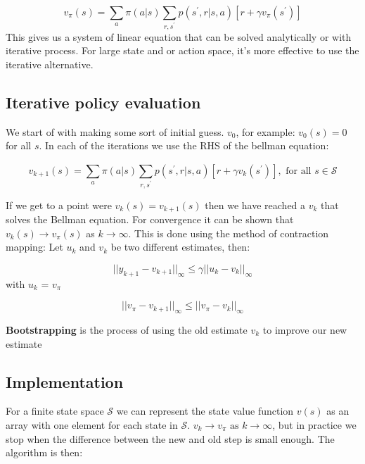 	\begin{equation}
		v_\pi(s) = \sum_{a}^{} \pi (a|s) \sum_{r,s^{\prime}}^{} p(s^{\prime},r|s,a)[r + \gamma v_\pi(s^{\prime})] 
	\end{equation}
This gives us a system of linear equation that can be solved analytically or with iterative process. For large state and or action space, it's more effective to use the iterative alternative. 

\subsection*{Iterative policy evaluation}
We start of with making some sort of initial guess. $v_0$, for example: $v_0(s) = 0$ for all $s$. In each of the iterations we use the RHS of the bellman equation: 

	\begin{equation}
		v_{k+1}(s) = \sum_{a}^{} \pi (a|s) \sum_{r,s^{\prime}}^{} p(s^{\prime},r|s,a)[r + \gamma v_k(s^{\prime})], \text{ for all } s \in \mathcal{S}
	\end{equation}

If we get to a point were $v_k(s) = v_{k+1}(s)$ then we have reached a $v_k$ that solves the Bellman equation. For convergence it can be shown that $v_k(s)\rightarrow v_\pi(s)  $ as $k \rightarrow \infty$.  This is done using the method of contraction mapping: Let $u_k$ and $v_k$ be two different estimates, then:

	\begin{equation}
		||y_{k+1} - v_{k+1}||_\infty \le \gamma ||u_k - v_k||_\infty
	\end{equation}
with $u_k$ = $v_\pi$

	\begin{equation}
		||v_\pi - v_{k+1}||_\infty \le ||v_\pi - v_k||_\infty
	\end{equation}

\textbf{Bootstrapping} is the process of using the old estimate $v_k$ to improve our new estimate 


\subsection*{Implementation}
For a finite state space $\mathcal{S}$ we can represent the state value function $v(s)$ as an array with one element for each state in $\mathcal{S}$. $v_k \rightarrow v_\pi \text{ as } k \rightarrow \infty$,  but in practice we stop when the difference between the new and old step is small enough. The algorithm is then: 

